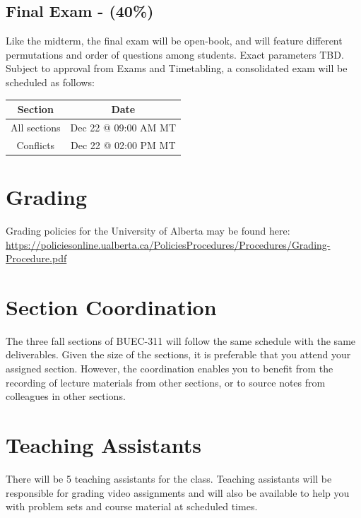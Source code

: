 \documentclass[11pt,]{article}
\begin{document}
\hypertarget{final-exam---40}{%
\subsection{Final Exam - (40\%)}\label{final-exam---40}}

Like the midterm, the final exam will be open-book, and will feature
different permutations and order of questions among students. Exact
parameters TBD. Subject to approval from Exams and Timetabling, a
consolidated exam will be scheduled as follows:

\begin{table}[!h]
\centering
\begin{tabular}{cc}
\toprule
Section & Date\\
\midrule
All sections & Dec 22 @ 09:00 AM MT\\
Conflicts & Dec 22 @ 02:00 PM MT\\
\bottomrule
\end{tabular}
\end{table}


\hypertarget{grading}{%
\section{Grading}\label{grading}}

Grading policies for the University of Alberta may be found here:
\url{https://policiesonline.ualberta.ca/PoliciesProcedures/Procedures/Grading-Procedure.pdf}



\hypertarget{section-coordination}{%
\section{Section Coordination}\label{section-coordination}}

The three fall sections of BUEC-311 will follow the same schedule with
the same deliverables. Given the size of the sections, it is preferable
that you attend your assigned section. However, the coordination enables
you to benefit from the recording of lecture materials from other
sections, or to source notes from colleagues in other sections.

\hypertarget{teaching-assistants}{%
\section{Teaching Assistants}\label{teaching-assistants}}

There will be 5 teaching assistants for the class. Teaching assistants
will be responsible for grading video assignments and will also be
available to help you with problem sets and course material at scheduled
times.
\end{document}

